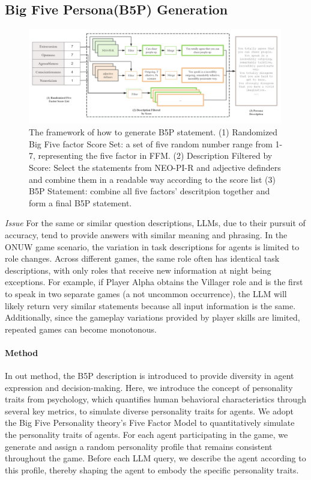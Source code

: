 \documentclass[11pt]{article}
\begin{document}
\subsection{Big Five Persona(B5P) Generation} \label{sec:B5P_System}

\begin{figure}[ht]
  \centering
  \includegraphics[width=0.99\textwidth]{img/B5P_framework2.jpg}
  \caption{ The framework of how to generate B5P statement.  (1) Randomized Big Five factor Score Set: a set of five random number range from 1-7, representing the five factor in FFM. (2) Description Filtered by Score: Select the statements from NEO-PI-R and adjective definders and combine them in a readable way according to the score list (3) B5P Statement: combine all five factors' descritpion together and form a final B5P statement. }
\label{fig:B5P_framework}
    \vspace{-1em}
\end{figure}


\textit{Issue} For the same or similar question descriptions, LLMs, due to their pursuit of accuracy, tend to provide answers with similar meaning and phrasing. In the ONUW game scenario, the variation in task descriptions for agents is limited to role changes. Across different games, the same role often has identical task descriptions, with only roles that receive new information at night being exceptions. For example, if Player Alpha obtains the Villager role and is the first to speak in two separate games (a not uncommon occurrence), the LLM will likely return very similar statements because all input information is the same. Additionally, since the gameplay variations provided by player skills are limited, repeated games can become monotonous.

\paragraph{Method} In out method, the B5P description is introduced to provide diversity in agent expression and decision-making. Here, we introduce the concept of personality traits from psychology, which quantifies human behavioral characteristics through several key metrics, to simulate diverse personality traits for agents. We adopt the Big Five Personality theory's Five Factor Model to quantitatively simulate the personality traits of agents. For each agent participating in the game, we generate and assign a random personality profile that remains consistent throughout the game. Before each LLM query, we describe the agent according to this profile, thereby shaping the agent to embody the specific personality traits.
\end{document}
